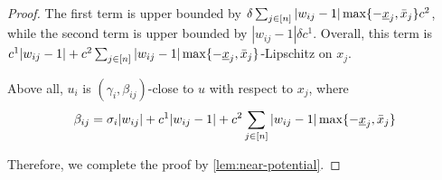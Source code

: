 \begin{proof}
The first term is upper bounded by $\delta \sum_{j\in[n]} |w_{ij}-1| \max\{ -\underline{x}_j, \bar{x}_j \} c^2$, while the second term is upper bounded by $|w_{ij}-1| \delta c^1$.
Overall, this term is $c^1 |w_{ij}-1| + c^2 \sum_{j\in[n]} |w_{ij}-1| \max\{ -\underline{x}_j, \bar{x}_j \}$-Lipschitz on $x_j$.

Above all, $u_i$ is $(\gamma_i, \beta_{ij})$-close to $u$ with respect to $x_j$, where
\begin{align*}
    \beta_{ij} = \sigma_i |w_{ij}| + c^1 |w_{ij}-1| + c^2 \sum_{j\in[n]} |w_{ij}-1| \max\{ -\underline{x}_j, \bar{x}_j \}
\end{align*}

Therefore, we complete the proof by \cref{lem:near-potential}.

\end{proof}